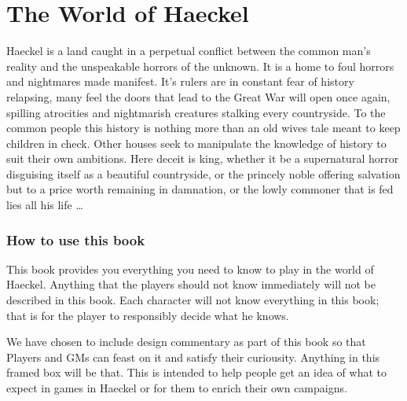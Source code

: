 \chapter{The World of Haeckel}\label{world}
\pagecolor{gray}\afterpage{\nopagecolor}


\newpage



\newpage
\begin{multicols}{2}

Haeckel is a land caught in a perpetual conflict between the common man's reality and the unspeakable horrors of the unknown. It is a home to foul horrors and nightmares made manifest. It's rulers are in constant fear of history relapsing, many feel the doors that lead to the Great War will open once again, spilling atrocities and nightmarish creatures stalking every countryside. To the common people this history is nothing more than an old wives tale meant to keep children in check. Other houses seek to manipulate the knowledge of history to suit their own ambitions. Here deceit is king, whether it be a supernatural horror disguising itself as a beautiful countryside, or the princely noble offering salvation but to a price worth remaining in damnation, or the lowly commoner that is fed lies all his life \ldots

\subsection{How to use this book}
This book provides you everything you need to know to play in the world of Haeckel. Anything that the players should not know immediately will not be described in this book. Each character will not know everything in this book; that is for the player to responsibly decide what he knows.

\begin{framed}\centering
We have chosen to include design commentary as part of this book so that Players and GMs can feast on it and satisfy their curiousity. Anything in this framed box will be that. This is intended to help people get an idea of what to expect in games in Haeckel or for them to enrich their own campaigns.
\end{framed}

\end{multicols}
